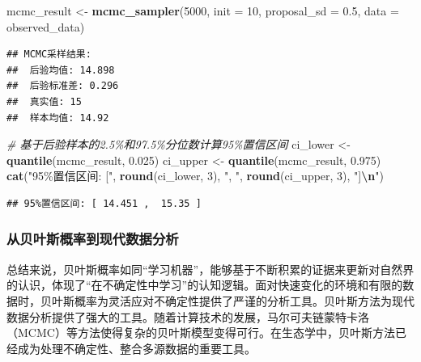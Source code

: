 \documentclass[
  twoside,12pt,fontset=none]{ctexbook}
\newenvironment{Shaded}{\begin{snugshade}}{\end{snugshade}}
\newcommand{\AttributeTok}[1]{\textcolor[rgb]{0.13,0.29,0.53}{#1}}
\newcommand{\CommentTok}[1]{\textcolor[rgb]{0.56,0.35,0.01}{\textit{#1}}}
\newcommand{\DecValTok}[1]{\textcolor[rgb]{0.00,0.00,0.81}{#1}}
\newcommand{\FloatTok}[1]{\textcolor[rgb]{0.00,0.00,0.81}{#1}}
\newcommand{\FunctionTok}[1]{\textcolor[rgb]{0.13,0.29,0.53}{\textbf{#1}}}
\newcommand{\NormalTok}[1]{#1}
\newcommand{\OtherTok}[1]{\textcolor[rgb]{0.56,0.35,0.01}{#1}}
\newcommand{\SpecialCharTok}[1]{\textcolor[rgb]{0.81,0.36,0.00}{\textbf{#1}}}
\newcommand{\StringTok}[1]{\textcolor[rgb]{0.31,0.60,0.02}{#1}}
\begin{document}
\begin{Shaded}
\begin{Highlighting}[]
\NormalTok{mcmc\_result }\OtherTok{\textless{}{-}} \FunctionTok{mcmc\_sampler}\NormalTok{(}\DecValTok{5000}\NormalTok{, }\AttributeTok{init =} \DecValTok{10}\NormalTok{, }\AttributeTok{proposal\_sd =} \FloatTok{0.5}\NormalTok{,}
  \AttributeTok{data =}\NormalTok{ observed\_data)}
\end{Highlighting}
\end{Shaded}

\begin{verbatim}
## MCMC采样结果:
##  后验均值: 14.898 
##  后验标准差: 0.296 
##  真实值: 15 
##  样本均值: 14.92
\end{verbatim}

\begin{Shaded}
\begin{Highlighting}[]
\CommentTok{\# 基于后验样本的2.5\%和97.5\%分位数计算95\%置信区间}
\NormalTok{ci\_lower }\OtherTok{\textless{}{-}} \FunctionTok{quantile}\NormalTok{(mcmc\_result, }\FloatTok{0.025}\NormalTok{)}
\NormalTok{ci\_upper }\OtherTok{\textless{}{-}} \FunctionTok{quantile}\NormalTok{(mcmc\_result, }\FloatTok{0.975}\NormalTok{)}
\FunctionTok{cat}\NormalTok{(}\StringTok{"95\%置信区间: ["}\NormalTok{, }\FunctionTok{round}\NormalTok{(ci\_lower, }\DecValTok{3}\NormalTok{), }\StringTok{", "}\NormalTok{,}
    \FunctionTok{round}\NormalTok{(ci\_upper, }\DecValTok{3}\NormalTok{), }\StringTok{"]}\SpecialCharTok{\textbackslash{}n}\StringTok{"}\NormalTok{)}
\end{Highlighting}
\end{Shaded}

\begin{verbatim}
## 95%置信区间: [ 14.451 ,  15.35 ]
\end{verbatim}

\hypertarget{ux4eceux8d1dux53f6ux65afux6982ux7387ux5230ux73b0ux4ee3ux6570ux636eux5206ux6790}{%
\subsubsection{从贝叶斯概率到现代数据分析}\label{ux4eceux8d1dux53f6ux65afux6982ux7387ux5230ux73b0ux4ee3ux6570ux636eux5206ux6790}}

总结来说，贝叶斯概率如同``学习机器''，能够基于不断积累的证据来更新对自然界的认识，体现了``在不确定性中学习''的认知逻辑。面对快速变化的环境和有限的数据时，贝叶斯概率为灵活应对不确定性提供了严谨的分析工具。贝叶斯方法为现代数据分析提供了强大的工具。随着计算技术的发展，马尔可夫链蒙特卡洛（MCMC）等方法使得复杂的贝叶斯模型变得可行。在生态学中，贝叶斯方法已经成为处理不确定性、整合多源数据的重要工具。
\end{document}
